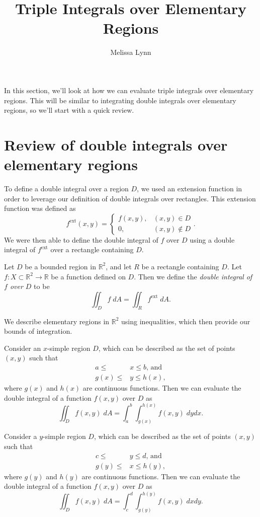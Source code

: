 \documentclass{ximera}
\title{Triple Integrals over Elementary Regions}
\author{Melissa Lynn}
\begin{document}
  
\begin{abstract}  
\end{abstract}  
\maketitle  

In this section, we'll look at how we can evaluate triple integrals over elementary regions. This will be similar to integrating double integrals over elementary regions, so we'll start with a quick review.

\section*{Review of double integrals over elementary regions}

To define a double integral over a region $D$, we used an extension function in order to leverage our definition of double integrals over rectangles. This extension function was defined as
\[
f^{\text{ext}}(x,y) = \begin{cases}
f(x,y), & (x,y)\in D\\
0, & (x,y)\notin D
\end{cases}.
\]
We were then able to define the double integral of $f$ over $D$ using a double integral of $f^{\text{ext}}$ over a rectangle containing $D$.

\begin{definition}
Let $D$ be a bounded region in $\mathbb{R}^2$, and let $R$ be a rectangle containing $D$. Let $f:X\subset\mathbb{R}^2\rightarrow\mathbb{R}$ be a function defined on $D$. Then we define the \emph{double integral of $f$ over $D$} to be
\[
\iint_D f\;dA = \iint_R f^{\text{ext}}\;dA.
\]
\end{definition}

We describe elementary regions in $\mathbb{R}^2$ using inequalities, which then provide our bounds of integration.

\begin{proposition}
Consider an $x$-simple region $D$, which can be described as the set of points $(x,y)$ such that
\begin{align*}
a\leq &x\leq b\text{, and}\\
g(x)\leq &y \leq h(x),
\end{align*}
where $g(x)$ and $h(x)$ are continuous functions. Then we can evaluate the double integral of a function $f(x,y)$ over $D$ as
\[
\iint_D f(x,y)\;dA = \int_a^b\int_{g(x)}^{h(x)} f(x,y)\;dydx.
\]

Consider a $y$-simple region $D$, which can be described as the set of points $(x,y)$ such that
\begin{align*}
c\leq & y\leq d\text{, and}\\
g(y)\leq & x \leq h(y),
\end{align*}
where $g(y)$ and $h(y)$ are continuous functions. Then we can evaluate the double integral of a function $f(x,y)$ over $D$ as
\[
\iint_D f(x,y)\;dA = \int_c^d\int_{g(y)}^{h(y)} f(x,y)\;dxdy.
\]
\end{proposition}
\end{document}
